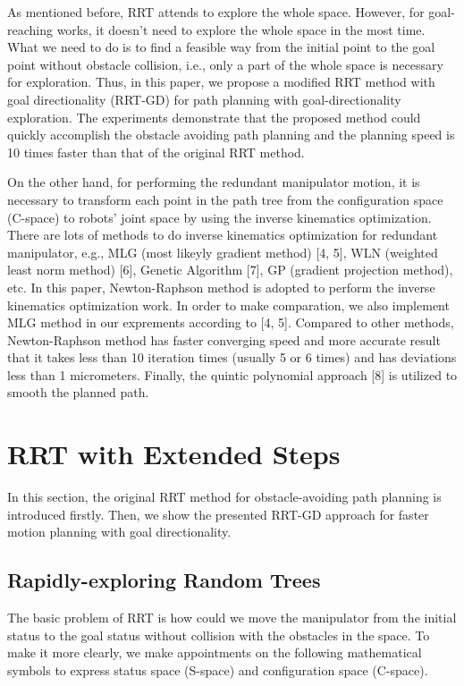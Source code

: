 \documentclass[letterpaper, 10 pt, conference]{ieeeconf}  %
\begin{document}
As mentioned before, RRT attends to explore the whole space. However, for goal-reaching works, it doesn't need to explore the whole space in the most time. What we need to do is to find a feasible way from the initial point to the goal point without obstacle collision, i.e., only a part of the whole space is necessary for exploration. Thus, in this paper, we propose a modified RRT method with goal directionality (RRT-GD) for path planning with goal-directionality exploration. The experiments demonstrate that the proposed method could quickly accomplish the obstacle avoiding path planning and the planning speed is 10 times faster than that of the original RRT method.

On the other hand, for performing the redundant manipulator motion, it is necessary to transform each point in the path tree from the configuration space (C-space) to robots' joint space by using the inverse kinematics optimization. There are lots of methods to do inverse kinematics optimization for redundant manipulator, e.g., MLG (most likeyly gradient method) [4, 5], WLN (weighted least norm method) [6], Genetic Algorithm [7], GP (gradient projection method), etc. In this paper, Newton-Raphson method is adopted to perform the inverse kinematics optimization work. In order to make comparation, we also implement MLG method in our exprements according to [4, 5]. Compared to other methods, Newton-Raphson method has faster converging speed and more accurate result that it takes less than 10 iteration times (usually 5 or 6 times) and has deviations less than 1 micrometers. Finally, the quintic polynomial approach [8] is utilized to smooth the planned path.

\section{RRT with Extended Steps}

In this section, the original RRT method for obstacle-avoiding path planning is introduced firstly. Then, we show the presented RRT-GD approach for faster motion planning with goal directionality.

\subsection{Rapidly-exploring Random Trees}

The basic problem of RRT is how could we move the manipulator from the initial status to the goal status without collision with the obstacles in the space. To make it more clearly, we make appointments on the following mathematical symbols to express status space (S-space) and configuration space (C-space).
\end{document}
